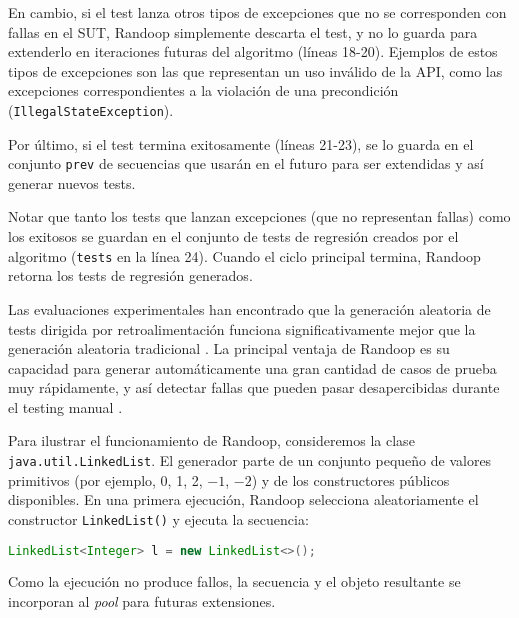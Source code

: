 En cambio, si el test lanza otros tipos de excepciones que no se corresponden
con fallas en el SUT, \textsf{Randoop} simplemente descarta el test, y no lo guarda para
extenderlo en iteraciones futuras del algoritmo (líneas 18-20). Ejemplos de
estos tipos de excepciones son las que representan un uso inválido de la API,
como las excepciones correspondientes a la violación de una
precondición (\texttt{IllegalStateException}).

Por último, si el test termina exitosamente (líneas 21-23), se lo guarda en el
conjunto \texttt{prev} de secuencias que usarán en el futuro para ser extendidas
y así generar nuevos tests. 

Notar que tanto los tests que lanzan excepciones (que no representan fallas) como los 
exitosos se guardan en el conjunto de tests de regresión creados por el
algoritmo (\texttt{tests} en la línea 24). Cuando el ciclo principal termina,
\textsf{Randoop} retorna los tests de regresión generados.

Las evaluaciones experimentales han encontrado que la generación aleatoria de tests dirigida 
por retroalimentación funciona significativamente mejor que la generación
aleatoria tradicional \cite{Pacheco07,Pacheco08}.
La principal ventaja de \textsf{Randoop} es su capacidad para generar
automáticamente una gran cantidad de casos de prueba muy rápidamente, y así 
detectar fallas que pueden pasar desapercibidas durante el testing
manual \cite{Pacheco07,Pacheco08}.


Para ilustrar el funcionamiento de Randoop, consideremos la clase
\texttt{java.util.LinkedList}. El generador parte de un conjunto pequeño de
valores primitivos (por ejemplo, 0, 1, 2, $-1$, $-2$) y de los
constructores públicos disponibles. En una primera ejecución, Randoop
selecciona aleatoriamente el constructor \texttt{LinkedList()} y
ejecuta la secuencia:
\\
\begin{lstlisting}[language=Java,basicstyle=\ttfamily\small,columns=fullflexible,keepspaces=true]
LinkedList<Integer> l = new LinkedList<>();
\end{lstlisting}

Como la ejecución no produce fallos, la secuencia y el objeto resultante
se incorporan al \emph{pool} para futuras extensiones.

